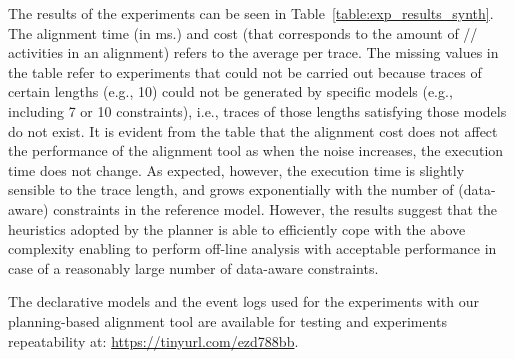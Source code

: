 The results of the experiments can be seen in Table~\ref{table:exp_results_synth}. The alignment time (in ms.) and cost (that corresponds to the amount of // activities in an alignment) refers to the average per trace. The missing values in the table refer to experiments that could not be carried out because traces of certain lengths (e.g., 10) could not be generated by specific models (e.g., including 7 or 10 constraints), i.e., traces of those lengths satisfying those models do not exist. It is evident from the table that the alignment cost does not affect the performance of the alignment tool as when the noise increases, the execution time does not change. As expected, however, the execution time is slightly sensible to the trace length, and grows exponentially with the number of (data-aware) constraints in the reference model. However, the results suggest that the heuristics adopted by the planner is able to efficiently cope with the above complexity enabling to perform off-line analysis with acceptable performance in case of a reasonably large number of data-aware constraints.


The declarative models and the event logs used for the experiments with our planning-based alignment tool are available for testing and experiments repeatability at: \url{https://tinyurl.com/ezd788bb}.

%
%

